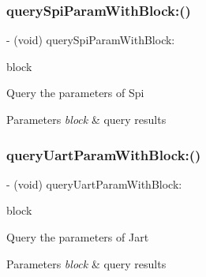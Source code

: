 \subsubsection{\texorpdfstring{query\+Spi\+Param\+With\+Block\+:()}{querySpiParamWithBlock:()}}
{\footnotesize\ttfamily -\/ (void) query\+Spi\+Param\+With\+Block\+: \begin{DoxyParamCaption}\item[{(P\+V\+Query\+Spi\+Param\+Block)}]{block }\end{DoxyParamCaption}}

Query the parameters of Spi


\begin{DoxyParams}{Parameters}
{\em block} & query results \\
\hline
\end{DoxyParams}
\mbox{\label{interface_p_v_mount_controller_ae409b6699b65229e0f78253e4b0fe30e}} 
\subsubsection{\texorpdfstring{query\+Uart\+Param\+With\+Block\+:()}{queryUartParamWithBlock:()}}
{\footnotesize\ttfamily -\/ (void) query\+Uart\+Param\+With\+Block\+: \begin{DoxyParamCaption}\item[{(P\+V\+Query\+Uart\+Param\+Block)}]{block }\end{DoxyParamCaption}}

Query the parameters of Jart


\begin{DoxyParams}{Parameters}
{\em block} & query results \\
\hline
\end{DoxyParams}
\mbox{\label{interface_p_v_mount_controller_a0972ee41c4633fa827ac26a021f911b9}} 
